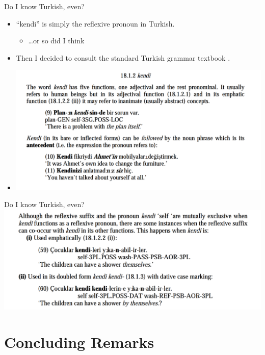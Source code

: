 \documentclass{beamer}
\begin{document}
  \begin{frame}{Do I know Turkish, even?}
    \begin{itemize}
      \item<1-> ``kendi'' is simply the reflexive pronoun in Turkish.
        \begin{itemize}
          \item<2-> \dots or so did I think
        \end{itemize}
      \item<3-> Then I decided to consult the standard Turkish grammar
        textbook \cite{goksel2004turkish}.
      \item<4->
        \begin{center}
          \includegraphics[scale=0.3]{resources/kendi-functions.png}
         \end{center}
    \end{itemize}
  \end{frame}

  \begin{frame}{Do I know Turkish, even?}
    \includegraphics[scale=0.35]{resources/kendi-exceptions.png}
  \end{frame}

  \section{Concluding Remarks}
\end{document}

